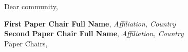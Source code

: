 
Dear community,

\lipsum[3-6]



\vspace{1ex}
\noindent
\textbf{First Paper Chair Full Name}, \textit{Affiliation, Country}\\
\textbf{Second Paper Chair Full Name}, \textit{Affiliation, Country}\\
Paper Chairs, \conferenceAcronym\\
